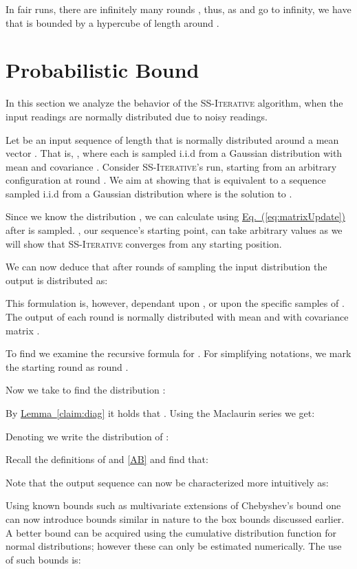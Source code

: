 \documentclass[preprint,12pt]{elsarticle}
\newcommand{\namedref}[2]{\hyperref[#2]{#1~\ref*{#2}}}
\newcommand{\lemmaref}[1]{\namedref{Lemma}{#1}}
\newcommand{\namedrefeq}[2]{\hyperref[#2]{#1~\mbox{\rm(\ref*{#2})}}}
\newcommand{\equationref}[1]{\namedrefeq{Eq.}{#1}}
\newcommand{\syncAlg}{\textsc{SS-Iterative}\xspace}
\begin{document}
In fair runs,
there are infinitely many rounds , thus, as  and  go to
infinity, we have that  is bounded by a hypercube of
length  around .



\section{Probabilistic Bound}\label{sec:Probabilistic}
In this section we analyze the behavior of the \syncAlg algorithm, when the input readings are normally distributed
due to noisy readings. 

Let  be an input sequence of length  that is normally distributed around a mean vector . That is, , where each is sampled i.i.d from a Gaussian distribution with mean  and covariance . Consider \syncAlg's run, starting from an arbitrary configuration at round . We aim at showing that  is equivalent to a sequence  sampled i.i.d from a Gaussian distribution  where  is the solution to .

Since we know the distribution , we can calculate  using \equationref{eq:matrixUpdate} after  is sampled. , our sequence's starting point, can take arbitrary values as we will show that \syncAlg  converges from any starting position. 

We can now deduce that after  rounds of sampling the input distribution the output  is distributed as:

This formulation is, however, dependant upon , or upon the specific samples of . The output of each round is normally distributed with mean  and with covariance matrix .



To find  we examine the recursive formula for . For simplifying notations, we mark the starting
round  as round .

Now we take  to find the distribution :

By \lemmaref{claim:diag} it holds that . Using the Maclaurin series we get:


Denoting  we write the distribution of :


Recall the definitions of  and  \eqref{AB} and find that:

Note that the output sequence can now be characterized more intuitively as:


Using known bounds such as multivariate extensions of Chebyshev's bound one can now introduce bounds similar in nature to the box bounds discussed earlier. A better bound can be acquired using the cumulative distribution function for normal distributions; however these can only be estimated numerically. The use of such bounds is:
\end{document}
